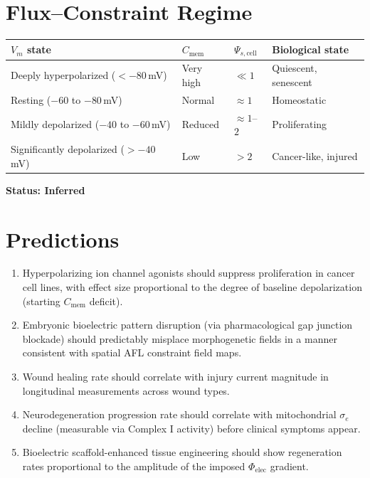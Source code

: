 \documentclass[12pt,a4paper]{article}
\begin{document}
\section{Flux--Constraint Regime}

\begin{center}
\begin{tabular}{llll}
\toprule
$V_m$ state & $C_{\mathrm{mem}}$ & $\Psi_{s,\mathrm{cell}}$ & Biological state \\
\midrule
Deeply hyperpolarized ($< -80$\,mV) & Very high & $\ll 1$ & Quiescent, senescent \\
Resting ($-60$ to $-80$\,mV) & Normal & $\approx 1$ & Homeostatic \\
Mildly depolarized ($-40$ to $-60$\,mV) & Reduced & $\approx 1$--$2$ & Proliferating \\
Significantly depolarized ($> -40$\,mV) & Low & $> 2$ & Cancer-like, injured \\
\bottomrule
\end{tabular}
\end{center}

\textbf{Status: Inferred}

\section{Predictions}

\begin{enumerate}
    \item Hyperpolarizing ion channel agonists should suppress proliferation in cancer cell lines, with effect size proportional to the degree of baseline depolarization (starting $C_{\mathrm{mem}}$ deficit).
    \item Embryonic bioelectric pattern disruption (via pharmacological gap junction blockade) should predictably misplace morphogenetic fields in a manner consistent with spatial AFL constraint field maps.
    \item Wound healing rate should correlate with injury current magnitude in longitudinal measurements across wound types.
    \item Neurodegeneration progression rate should correlate with mitochondrial $\sigma_e$ decline (measurable via Complex I activity) before clinical symptoms appear.
    \item Bioelectric scaffold-enhanced tissue engineering should show regeneration rates proportional to the amplitude of the imposed $\Phi_{\mathrm{elec}}$ gradient.
\end{enumerate}
\end{document}
